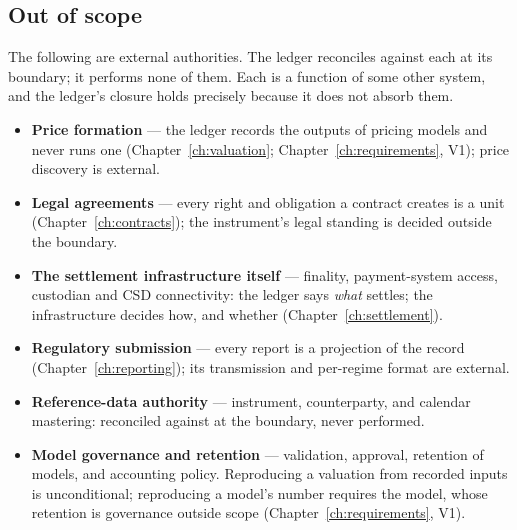\documentclass[11pt,a4paper]{article}
\begin{document}
\subsection{Out of scope}

The following are external authorities. The ledger reconciles against each at its boundary;
it performs none of them. Each is a function of some other system, and the ledger's
closure holds precisely because it does not absorb them.

\begin{itemize}[leftmargin=*, itemsep=2.5pt]
\item \textbf{Price formation} --- the ledger records the outputs of pricing models and
  never runs one (Chapter~\ref{ch:valuation}; Chapter~\ref{ch:requirements}, V1); price
  discovery is external.
\item \textbf{Legal agreements} --- every right and obligation a contract creates is a
  unit (Chapter~\ref{ch:contracts}); the instrument's legal standing is decided outside
  the boundary.
\item \textbf{The settlement infrastructure itself} --- finality, payment-system access,
  custodian and CSD connectivity: the ledger says \emph{what} settles; the infrastructure
  decides how, and whether (Chapter~\ref{ch:settlement}).
\item \textbf{Regulatory submission} --- every report is a projection of the record
  (Chapter~\ref{ch:reporting}); its transmission and per-regime format are external.
\item \textbf{Reference-data authority} --- instrument, counterparty, and calendar
  mastering: reconciled against at the boundary, never performed.
\item \textbf{Model governance and retention} --- validation, approval, retention of
  models, and accounting policy. Reproducing a valuation from recorded inputs is
  unconditional; reproducing a model's number requires the model, whose retention is
  governance outside scope (Chapter~\ref{ch:requirements}, V1).
\end{itemize}
\end{document}
